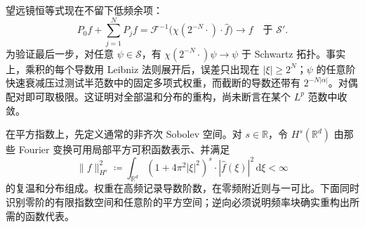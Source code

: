 望远镜恒等式现在不留下低频余项：
\begin{equation}\label{b2:eq:19-inhomogeneous-reconstruction}
 P_0f+\sum_{j=1}^NP_jf
 =\mathcal F^{-1}\bigl(\chi(2^{-N}\cdot)\cdot\widehat f\bigr)
 \longrightarrow f\quad\text{于 }\mathcal S'.
\end{equation}
为验证最后一步，对任意 \(\psi\in\mathcal S\)，有 \(\chi(2^{-N}\cdot)\psi\to\psi\) 于 Schwartz 拓扑。事实上，乘积的每个导数用 Leibniz 法则展开后，误差只出现在 \(|\xi|\geq2^N\)；\(\psi\) 的任意阶快速衰减压过测试半范数中的固定多项式权重，而截断的导数还带有 \(2^{-N|\alpha|}\)。对偶配对即可取极限。这证明对全部温和分布的重构，尚未断言在某个 \(L^p\) 范数中收敛。

\ProseParagraphBreak

在平方指数上，先定义通常的非齐次 Sobolev 空间。对 \(s\in\mathbb R\)，令 \(H^s(\mathbb R^d)\) 由那些 Fourier 变换可用局部平方可积函数表示、并满足
\[
 \|f\|_{H^s}^2\coloneqq
 \int_{\mathbb R^d}(1+4\pi^2|\xi|^2)^s
                    \cdot|\widehat f(\xi)|^2\,\mathrm d\xi<\infty
\]
的复温和分布组成。权重在高频记录导数阶数，在零频附近则与一可比。下面同时识别零阶的有限指数空间和任意阶的平方空间；逆向必须说明频率块确实重构出所需的函数代表。

